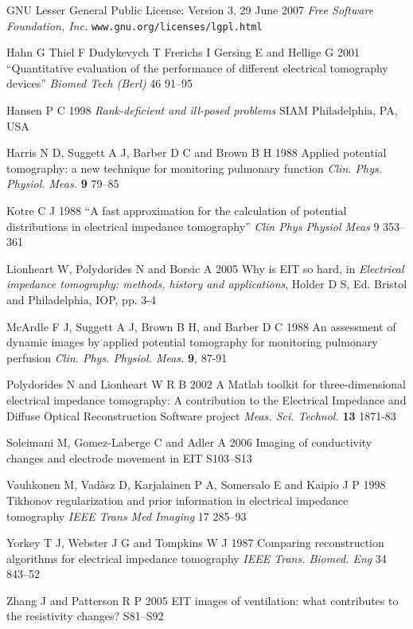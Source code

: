 \documentclass[12pt]{iopart}
\begin{document}
\item[]
GNU Lesser General Public License: Version 3, 29 June 2007
{\em Free Software Foundation, Inc.}
\verb+www.gnu.org/licenses/lgpl.html+

\item[]
Hahn G Thiel F Dudykevych T Frerichs I Gersing E
and Hellige G 2001
``Quantitative evaluation of the performance of
different electrical tomography devices''
{\em  Biomed Tech (Berl)}
46 91--95

\item[]
Hansen P C 1998 {\em Rank-deficient and ill-posed problems}
SIAM Philadelphia, PA, USA

\item[]
Harris N D, Suggett A J, Barber D C and Brown B H 1988 Applied
potential tomography: a new technique for monitoring pulmonary
function {\em Clin. Phys. Physiol. Meas.} {\bf 9} 79--85


\item[]
Kotre C J 1988
``A fast approximation for the calculation of potential distributions in electrical impedance tomography''
{\em Clin Phys Physiol Meas}
9 353--361

\item[]
Lionheart W, Polydorides N and Borsic A 2005 Why is EIT so hard,
in {\em Electrical impedance tomography: methods, history and
applications}, Holder D S, Ed. Bristol and Philadelphia, IOP, pp.
3-4

\item[]
McArdle F J, Suggett A J, Brown B H, and Barber D C 1988 An
assessment of dynamic images by applied potential tomography for
monitoring pulmonary perfusion {\em Clin. Phys. Physiol. Meas.}
{\bf 9}, 87-91


\item[]
Polydorides N and Lionheart W R B 2002 A Matlab toolkit for
three-dimensional electrical impedance tomography: A contribution
to the Electrical Impedance and Diffuse Optical Reconstruction
Software project {\em Meas. Sci. Technol.} {\bf 13} 1871-83


\item[]
Soleimani M, Gomez-Laberge C and Adler A 2006 Imaging of
conductivity changes and electrode movement in EIT 
S103--S13

\item[]
Vauhkonen M, Vad\`asz D, Karjalainen P A, Somersalo E and
Kaipio J P 1998
 Tikhonov regularization and prior information in
electrical impedance tomography
 {\em IEEE Trans Med Imaging}
17 285--93

\item[]
Yorkey T J, Webster J G and Tompkins W J 1987
Comparing reconstruction algorithms for electrical
impedance tomography
{\em IEEE Trans. Biomed. Eng}
34 843--52

\item[]
Zhang J and Patterson R P 2005 EIT images of ventilation: what
contributes to the resistivity changes?  S81--S92

\endrefs
\end{document}

